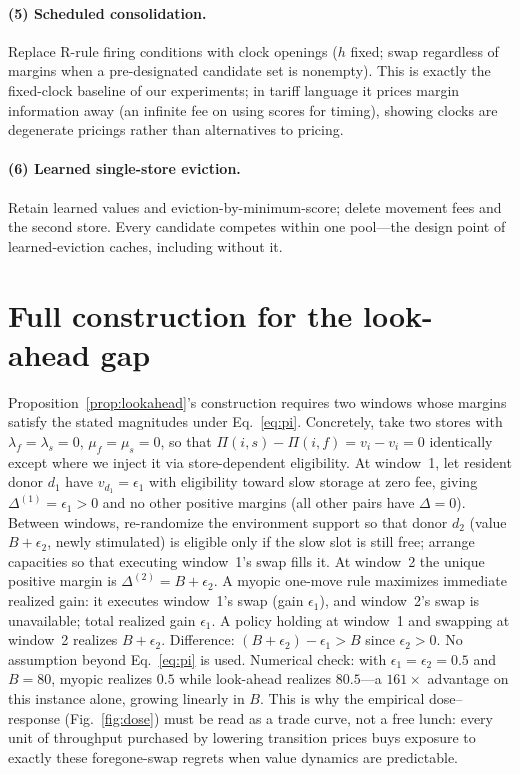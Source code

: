 \documentclass[10pt,twocolumn]{article}
\theoremstyle{definition}
\begin{document}
\paragraph{(5) Scheduled consolidation.}
Replace R-rule firing conditions with clock openings ($h$ fixed; swap regardless of margins when a
pre-designated candidate set is nonempty). This is exactly the fixed-clock baseline of our experiments; in
tariff language it prices margin information away (an infinite fee on using scores for timing), showing
clocks are degenerate pricings rather than alternatives to pricing.

\paragraph{(6) Learned single-store eviction.}
Retain learned values and eviction-by-minimum-score; delete movement fees and the second store. Every
candidate competes within one pool---the design point of learned-eviction caches, including
without it.

\section{Full construction for the look-ahead gap}\label{app:limits}
Proposition~\ref{prop:lookahead}'s construction requires two windows whose margins satisfy the stated
magnitudes under Eq.~\eqref{eq:pi}. Concretely, take two stores with $\lambda_f=\lambda_s=0$,
$\mu_f=\mu_s=0$, so that $\Pi(i,s)-\Pi(i,f)=v_i-v_i=0$ identically except where we inject it via
store-dependent eligibility. At window~1, let resident donor $d_1$ have $v_{d_1}=\epsilon_1$ with
eligibility toward slow storage at zero fee, giving $\Delta^{(1)}=\epsilon_1>0$ and no other positive
margins (all other pairs have $\Delta=0$). Between windows, re-randomize the environment support so that
donor $d_2$ (value $B+\epsilon_2$, newly stimulated) is eligible only if the slow slot is still free;
arrange capacities so that executing window~1's swap fills it. At window~2 the unique positive margin is
$\Delta^{(2)}=B+\epsilon_2$. A myopic one-move rule maximizes immediate realized gain: it executes
window~1's swap (gain $\epsilon_1$), and window~2's swap is unavailable; total realized gain $\epsilon_1$.
A policy holding at window~1 and swapping at window~2 realizes $B+\epsilon_2$. Difference:
$(B+\epsilon_2)-\epsilon_1>B$ since $\epsilon_2>0$. No assumption beyond Eq.~\eqref{eq:pi} is used.
Numerical check: with $\epsilon_1=\epsilon_2=0.5$ and $B=80$, myopic realizes $0.5$ while look-ahead
realizes $80.5$---a $161\times$ advantage on this instance alone, growing linearly in $B$. This is why the
empirical dose--response (Fig.~\ref{fig:dose}) must be read as a trade curve, not a free lunch: every unit
of throughput purchased by lowering transition prices buys exposure to exactly these foregone-swap regrets
when value dynamics are predictable.
\end{document}
